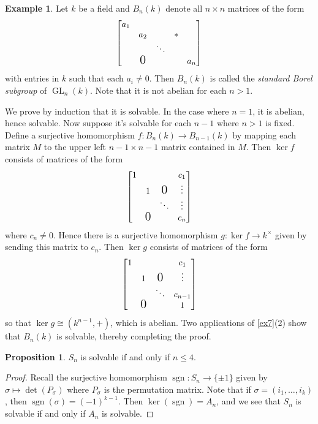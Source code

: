 \documentclass[10pt,letterpaper,cm]{nupset}
\theoremstyle{definition}
\newtheorem{exmp}[definition]{Example}
\theoremstyle{theorem}
\newtheorem{prop}[definition]{Proposition}
\theoremstyle{remark}
\newcommand{\1}{\mathbf{1}}
\newcommand{\0}{\vec 0}
\DeclareMathOperator*{\GL}{GL}
\DeclareMathOperator{\sgn}{sgn}
\begin{document}
\begin{exmp}
Let $k$ be a field and  $B_n(k)$ denote all $n\times n$ matrices of the form
\[
  \left[
    \begin{matrix}
       a_1 & & &  &\\
       & a_2 & & \Large{*}  \\
       & & \ddots & & \\
       & \text{\Large0}  & & & a_{n} 
\\
    \end{matrix}
  \right]
\] with entries in $k$ such that each $a_i \ne 0$. Then $B_n(k)$ is called the \textit{standard Borel subgroup} of $\GL_n(k)$. Note that it is not abelian for each $n>1$. 

\medskip

 We prove by induction that it is solvable.  In the case where $n=1$, it is abelian, hence solvable. Now suppose it's solvable for each $n-1$ where $n>1$ is fixed. Define a surjective homomorphism $f: B_n(k) \to B_{n-1}(k)$ by mapping each matrix $M$ to the upper left $n-1 \times n-1$ matrix contained in $M$. Then $\ker{f}$ consists of matrices of the form
\[
  \left[
    \begin{matrix}
       1 & & &  c_1\\
       & 1 &  \text{\Large0} & \vdots \\
       & & \ddots & \vdots  \\
        & \text{\Large0}  & &  c_{n} 
\\
    \end{matrix}
  \right]
\] where $c_{n} \ne 0$. Hence there is a surjective homomorphism $g: \ker{f} \to k^{\times}$ given by sending this matrix to $c_n$. Then $\ker{g}$ consists of matrices of the form
\[
  \left[
    \begin{matrix}
       1 & & &  c_1\\
       & 1 &  \text{\Large0} & \vdots \\
       & & \ddots & c_{n-1}  \\
        & \text{\Large0}  & &  1 
\\
    \end{matrix}
  \right]
  \] so that $\ker{g} \cong (k^{n-1}, +)$, which is abelian.  Two applications of \cref{ex7}(2) show that $B_n(k)$ is solvable, thereby completing the proof.
\end{exmp}

\begin{prop}
$S_n$ is solvable  if and only if $n\leq 4$.
\end{prop}
\begin{proof}
Recall the surjective homomorphism $\sgn: S_n \to \{\pm 1\}$ given by $\sigma \mapsto \det(P_\sigma)$ where $P_\sigma$ is the permutation matrix. Note that if $\sigma = (i_1, \ldots, i_k)$, then $\sgn(\sigma) = ({-1})^{k-1}$. Then $\ker(\sgn) = A_n$, and we see that $S_n$ is solvable  if and only if $A_n$ is solvable. 
\end{proof}
\end{document}
